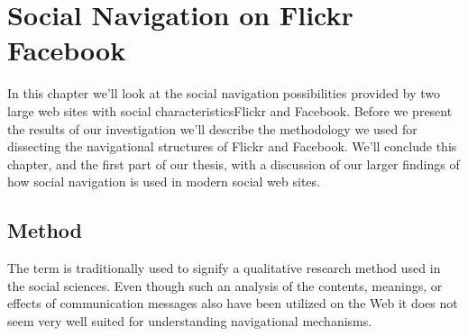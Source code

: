 \chapter{Social Navigation on Flickr \oldand Facebook}
\label{chapter:analysis}

In this chapter we'll look at the social navigation possibilities provided by
two large web sites with social characteristics\dash{}Flickr and Facebook.
Before we present the results of our investigation we'll describe the
methodology we used for dissecting the navigational structures of Flickr and
Facebook. We'll conclude this chapter, and the first part of our thesis, with
a discussion of our larger findings of how social navigation is used in
modern social web sites.

\section{Method}
\label{section:flickr.facebook.methodology}

The term  is traditionally used to signify a
qualitative research method used in the social sciences.
Even though such an analysis of the contents, meanings, or effects of
communication messages also have been utilized on the Web \citep{weare00}
it does not seem very well suited for understanding navigational mechanisms.

